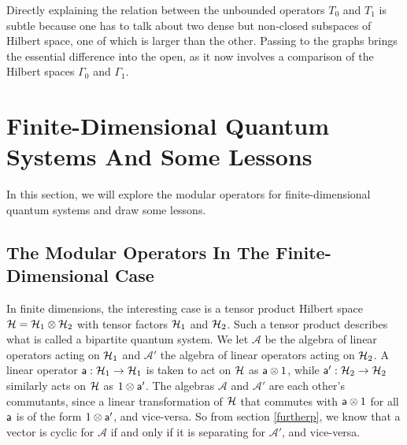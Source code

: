 \documentclass[12pt]{article}
\def\a{{\sf a}}
\numberwithin{equation}{section}
\def\A{{\mathcal A}}
\begin{document}
Directly explaining the relation between the unbounded operators $T_0$ and $T_1$ is subtle because one has to talk about
two dense but non-closed subspaces of Hilbert space, one of which is larger than the other.
  Passing to the graphs 
brings the essential difference into the open, as it now involves a comparison of the Hilbert spaces $\Gamma_0$ and $\Gamma_1$.


\section{Finite-Dimensional Quantum Systems And Some Lessons}\label{fte} 

In this section, we will explore the modular operators for finite-dimensional quantum systems and draw some lessons.

\subsection{The Modular Operators In The Finite-Dimensional Case}\label{fincase}

In finite dimensions, the interesting case is a tensor product Hilbert space ${\mathcal H}={\mathcal H}_1\otimes {\mathcal H}_2$ with tensor factors ${\mathcal H}_1$ and ${\mathcal H}_2$.
Such a tensor product describes what is called a bipartite quantum system.
We let $\A$ be the algebra of linear operators acting on ${\mathcal H}_1$ and $\A'$ the algebra of linear operators acting on ${\mathcal H}_2$.  A linear
operator $\a:\H_1\to \H_1$ is taken to act on ${\mathcal H}$ as $\a\otimes 1$, while $\a':\H_2\to\H_2$ similarly acts on ${\mathcal H}$ as
$1\otimes \a'$.  The algebras $\A$ and $\A'$ are each other's commutants, since a linear transformation of ${\mathcal H}$ that commutes
with $\a\otimes 1$ for all $\a$ is of the form $1\otimes \a'$, and vice-versa.    So from section \ref{furtherp}, 
we know that  a vector is cyclic for $\A$ if and only
if it is separating for $\A'$, and vice-versa.    
\end{document}
